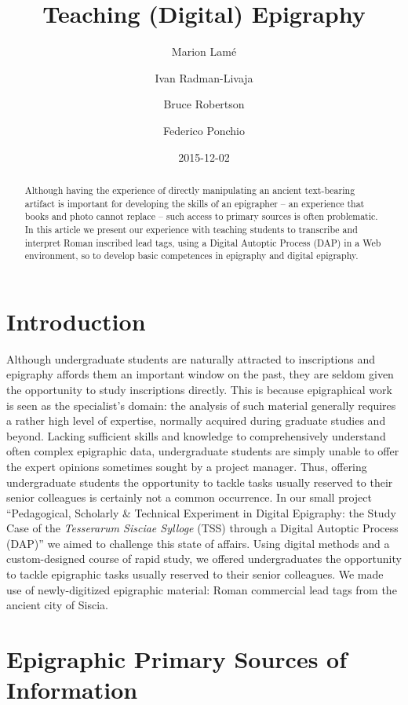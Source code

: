 \documentclass[amsthm,ebook]{saparticle}
\title{Teaching (Digital) Epigraphy}
\author[ilc]{Marion Lamé}\corref{first}
\author[zag]{Ivan Radman-Livaja}
\author[mau]{Bruce Robertson}
\author[isti]{Federico Ponchio}
\date{2015-12-02}
\begin{document}
\maketitle
\begin{abstract}
Although having the experience of directly manipulating an ancient text-bearing artifact is important for developing the
skills of an epigrapher – an experience that books and photo cannot replace – such access to primary sources is often
problematic. In this article we present our experience with teaching students to transcribe and interpret Roman
inscribed lead tags, using a Digital Autoptic Process (DAP) in a Web environment, so to develop basic competences in
epigraphy and digital epigraphy.
\end{abstract}

\section{Introduction}

\noindent Although undergraduate students are naturally attracted to inscriptions and epigraphy affords them an important window
on the past, they are seldom given the opportunity to study inscriptions directly. This is because epigraphical work is
seen as the specialist’s domain: the analysis of such material generally requires a rather high level of expertise,
normally acquired during graduate studies and beyond. Lacking sufficient skills and knowledge to comprehensively
understand often complex epigraphic data, undergraduate students are simply unable to offer the expert opinions
sometimes sought by a project manager. Thus, offering undergraduate students the opportunity to tackle tasks usually
reserved to their senior colleagues is certainly not a common occurrence. In our small project ``Pedagogical,
Scholarly \& Technical Experiment in Digital Epigraphy: the Study Case of the \emph{Tesserarum Sisciae Sylloge} (TSS) through
a Digital Autoptic Process (DAP)'' we aimed to challenge this state of affairs. Using digital methods and a
custom-designed course of rapid study, we offered undergraduates the opportunity to tackle epigraphic tasks usually
reserved to their senior colleagues. We made use of newly-digitized epigraphic material: Roman commercial lead tags
from the ancient city of Siscia.

\section{Epigraphic Primary Sources of Information}
\end{document}

